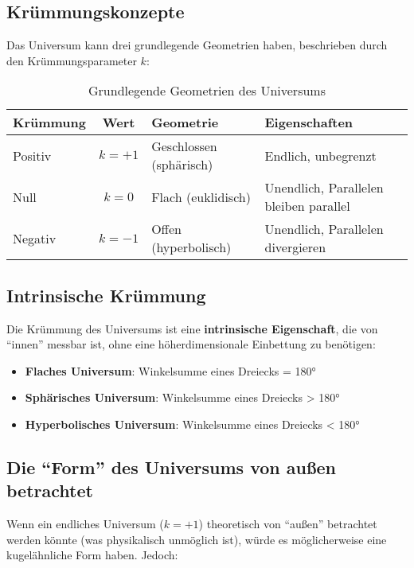 \documentclass[a4paper,12pt]{article}
\begin{document}
	\subsection{Krümmungskonzepte}
	
	Das Universum kann drei grundlegende Geometrien haben, beschrieben durch den Krümmungsparameter $k$:
	
	\begin{table}[h]
		\centering
		\begin{tabular}{lcll}
			\toprule
			\textbf{Krümmung} & \textbf{Wert} & \textbf{Geometrie} & \textbf{Eigenschaften} \\
			\midrule
			Positiv & $k = +1$ & Geschlossen (sphärisch) & Endlich, unbegrenzt \\
			Null & $k = 0$ & Flach (euklidisch) & Unendlich, Parallelen bleiben parallel \\
			Negativ & $k = -1$ & Offen (hyperbolisch) & Unendlich, Parallelen divergieren \\
			\bottomrule
		\end{tabular}
		\caption{Grundlegende Geometrien des Universums}
	\end{table}
	
	\subsection{Intrinsische Krümmung}
	
	Die Krümmung des Universums ist eine \textbf{intrinsische Eigenschaft}, die von ``innen'' messbar ist, ohne eine höherdimensionale Einbettung zu benötigen:
	
	\begin{itemize}
		\item \textbf{Flaches Universum}: Winkelsumme eines Dreiecks = 180°
		\item \textbf{Sphärisches Universum}: Winkelsumme eines Dreiecks > 180°
		\item \textbf{Hyperbolisches Universum}: Winkelsumme eines Dreiecks < 180°
	\end{itemize}
	
	\subsection{Die ``Form'' des Universums von außen betrachtet}
	
	Wenn ein endliches Universum ($k = +1$) theoretisch von ``außen'' betrachtet werden könnte (was physikalisch unmöglich ist), würde es möglicherweise eine kugelähnliche Form haben. Jedoch:
	
\end{document}
